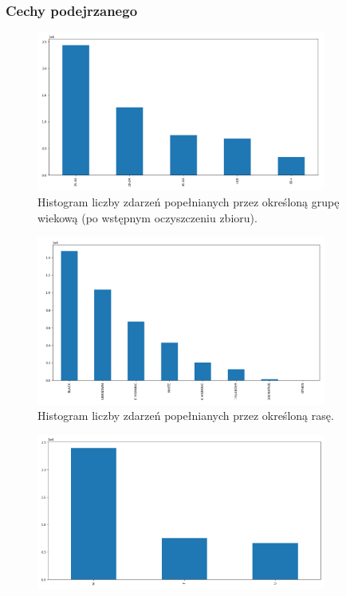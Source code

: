 \documentclass{classrep}
\begin{document}
{{            \subsubsection{Cechy podejrzanego} {
                \begin{figure}[!htbp]
                    \centering
                    \includegraphics[width=0.85\textwidth]{img/hist_susp_age_group.png}
                    \caption{Histogram liczby zdarzeń popełnianych przez określoną grupę wiekową (po wstępnym oczyszczeniu zbioru).}
                    \label{hist_susp_age_group}
                \end{figure}
                \begin{figure}[!htbp]
                    \centering
                    \includegraphics[width=0.85\textwidth]{img/hist_susp_race.png}
                    \caption{Histogram liczby zdarzeń popełnianych przez określoną rasę.}
                    \label{hist_susp_race}
                \end{figure}
                \begin{figure}[!htbp]
                    \centering
                    \includegraphics[width=0.85\textwidth]{img/hist_susp_sex.png}

\end{figure}}}}
\end{document}
